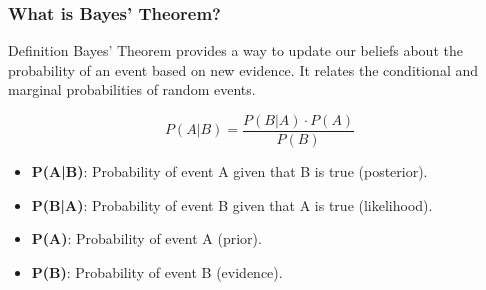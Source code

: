 \documentclass[aspectratio=169]{beamer}
\begin{document}
\begin{frame}[fragile]
    \frametitle{What is Bayes' Theorem?}
    \begin{block}{Definition}
        Bayes' Theorem provides a way to update our beliefs about the probability of an event based on new evidence. It relates the conditional and marginal probabilities of random events.
    \end{block}
    
    \begin{equation}
        P(A|B) = \frac{P(B|A) \cdot P(A)}{P(B)}
    \end{equation}
    \begin{itemize}
        \item \textbf{P(A|B)}: Probability of event A given that B is true (posterior).
        \item \textbf{P(B|A)}: Probability of event B given that A is true (likelihood).
        \item \textbf{P(A)}: Probability of event A (prior).
        \item \textbf{P(B)}: Probability of event B (evidence).
    \end{itemize}
\end{frame}
\end{document}
